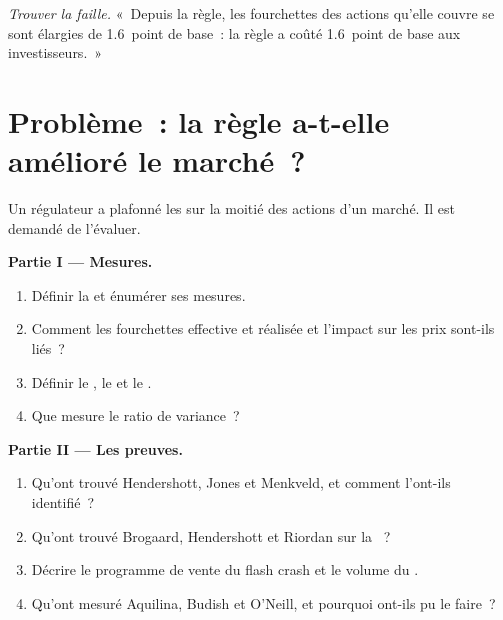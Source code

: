 \begin{exercise}[$\star\star\star$]\label{exo:mx:market-quality-and-regulation:8}
\emph{Trouver la faille.} «~Depuis la règle, les fourchettes des actions qu'elle couvre se sont élargies de 1.6~point de base~: la règle a coûté 1.6~point de base aux investisseurs.~»
\end{exercise}

\section{Problème~: la règle a-t-elle amélioré le marché~?}

\begin{problem}\label{pb:mx:market-quality-and-regulation:1}
Un régulateur a plafonné les  sur la moitié des actions d'un marché. Il est demandé de l'évaluer.

\medskip\noindent\textbf{Partie I --- Mesures.}
\begin{enumerate}
\item Définir la  et énumérer ses mesures.
\item Comment les fourchettes effective et réalisée et l'impact sur les prix sont-ils liés~?
\item Définir le , le  et le .
\item Que mesure le ratio de variance~?
\end{enumerate}

\medskip\noindent\textbf{Partie II --- Les preuves.}
\begin{enumerate}[resume]
\item Qu'ont trouvé Hendershott, Jones et Menkveld, et comment l'ont-ils identifié~?
\item Qu'ont trouvé Brogaard, Hendershott et Riordan sur la ~?
\item Décrire le programme de vente du flash crash et le volume du .
\item Qu'ont mesuré Aquilina, Budish et O'Neill, et pourquoi ont-ils pu le faire~?
\end{enumerate}


\end{problem}
